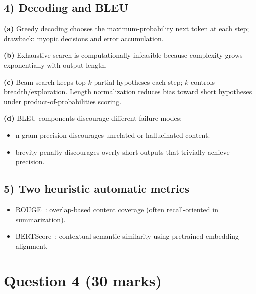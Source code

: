\documentclass[12pt]{article}
\begin{document}
\subsection*{4) Decoding and BLEU}
\textbf{(a)} Greedy decoding chooses the maximum-probability next token at each step; drawback: myopic decisions and error accumulation.

\textbf{(b)} Exhaustive search is computationally infeasible because complexity grows exponentially with output length.

\textbf{(c)} Beam search keeps top-$k$ partial hypotheses each step; $k$ controls breadth/exploration. Length normalization reduces bias toward short hypotheses under product-of-probabilities scoring.

\textbf{(d)} BLEU components discourage different failure modes:
\begin{itemize}[leftmargin=1.2em]
    \item n-gram precision discourages unrelated or hallucinated content.
    \item brevity penalty discourages overly short outputs that trivially achieve precision.
\end{itemize}

\subsection*{5) Two heuristic automatic metrics}
\begin{itemize}[leftmargin=1.2em]
    \item ROUGE~\cite{lin2004rouge}: overlap-based content coverage (often recall-oriented in summarization).
    \item BERTScore~\cite{zhang2020bertscore}: contextual semantic similarity using pretrained embedding alignment.
\end{itemize}

\section*{Question 4 (30 marks)}
\end{document}
